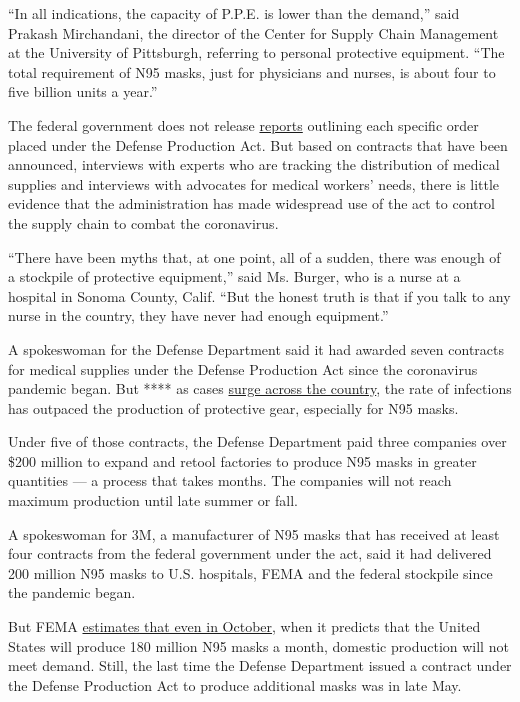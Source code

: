 ``In all indications, the capacity of P.P.E. is lower than the demand,''
said Prakash Mirchandani, the director of the Center for Supply Chain
Management at the University of Pittsburgh, referring to personal
protective equipment. ``The total requirement of N95 masks, just for
physicians and nurses, is about four to five billion units a year.''

The federal government does not release
\href{https://www.fema.gov/media-library-data/1582898704576-dc44bbe61cce3cf763cc8a6b92617188/2018_DPAC_Report_to_Congress.pdf}{reports}
outlining each specific order placed under the Defense Production Act.
But based on contracts that have been announced, interviews with experts
who are tracking the distribution of medical supplies and interviews
with advocates for medical workers' needs, there is little evidence that
the administration has made widespread use of the act to control the
supply chain to combat the coronavirus.

``There have been myths that, at one point, all of a sudden, there was
enough of a stockpile of protective equipment,'' said Ms. Burger, who is
a nurse at a hospital in Sonoma County, Calif. ``But the honest truth is
that if you talk to any nurse in the country, they have never had enough
equipment.''

A spokeswoman for the Defense Department said it had awarded seven
contracts for medical supplies under the Defense Production Act since
the coronavirus pandemic began. But **** as cases
\href{https://www.nytimes3xbfgragh.onion/interactive/2020/us/coronavirus-us-cases.html}{surge
across the country}, the rate of infections has outpaced the production
of protective gear, especially for N95 masks.

Under five of those contracts, the Defense Department paid three
companies over \$200 million to expand and retool factories to produce
N95 masks in greater quantities --- a process that takes months. The
companies will not reach maximum production until late summer or fall.

A spokeswoman for 3M, a manufacturer of N95 masks that has received at
least four contracts from the federal government under the act, said it
had delivered 200 million N95 masks to U.S. hospitals, FEMA and the
federal stockpile since the pandemic began.

But FEMA
\href{https://www.hassan.senate.gov/imo/media/doc/SCTF\%20Demand\%20PPE\%20Chart.pdf}{estimates
that even in October}, when it predicts that the United States will
produce 180 million N95 masks a month, domestic production will not meet
demand. Still, the last time the Defense Department issued a contract
under the Defense Production Act to produce additional masks was in late
May.

